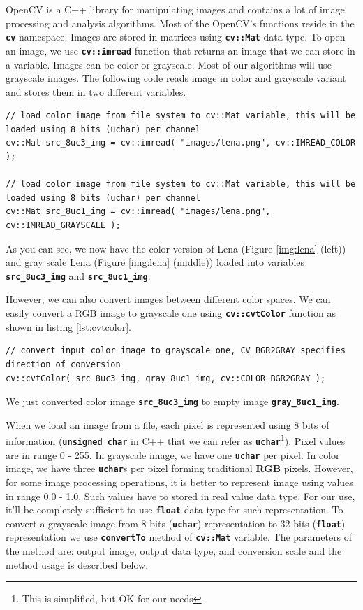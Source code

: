 \documentclass[10pt]{article}
\newcommand{\code}[1]{\textbf{\texttt{#1}}}
\begin{document}
OpenCV is a C++ library for manipulating images and contains a lot of image processing and analysis algorithms.
Most of the OpenCV's functions reside in the \code{cv} namespace.
Images are stored in matrices using \code{cv::Mat} data type.
To open an image, we use \code{cv::imread} function that returns an image that we can store in a variable.
Images can be color or grayscale. Most of our algorithms will use grayscale images.
The following code reads image in color and grayscale variant and stores them in two different variables.

\begin{lstlisting}[style=CStyle,caption={Reading an image.},label={lst:read_image}]
// load color image from file system to cv::Mat variable, this will be loaded using 8 bits (uchar) per channel
cv::Mat src_8uc3_img = cv::imread( "images/lena.png", cv::IMREAD_COLOR );

// load color image from file system to cv::Mat variable, this will be loaded using 8 bits (uchar) per channel
cv::Mat src_8uc1_img = cv::imread( "images/lena.png", cv::IMREAD_GRAYSCALE );
\end{lstlisting}

As you can see, we now have the color version of Lena (Figure \ref{img:lena} (left)) and gray scale Lena (Figure \ref{img:lena} (middle))
loaded into variables \code{src\_8uc3\_img} and \code{src\_8uc1\_img}.

However, we can also convert images between different color spaces.
We can easily convert a RGB image to grayscale one using \code{cv::cvtColor}
function as shown in listing \ref{lst:cvtcolor}.

\begin{lstlisting}[style=CStyle,caption={Converting a color image to a grascale one.},label={lst:cvtcolor}]
// convert input color image to grayscale one, CV_BGR2GRAY specifies direction of conversion
cv::cvtColor( src_8uc3_img, gray_8uc1_img, cv::COLOR_BGR2GRAY );
\end{lstlisting}

We just converted color image \code{src\_8uc3\_img} to empty image \code{gray\_8uc1\_img}.

When we load an image from a file, each pixel is represented using 8 bits of information (\code{unsigned char} in C++ that we can refer as
\code{uchar}\footnote{This is simplified, but OK for our needs}). Pixel values are in range 0 - 255. In grayscale image, we have one \code{uchar} per pixel.
In color image, we have three \code{uchar}s per pixel forming traditional \textbf{RGB} pixels.
However, for some image processing operations, it is better to represent image using values in range 0.0 - 1.0.
Such values have to stored in real value data type. For our use, it'll be completely sufficient to use \code{float} data type for such representation.
To convert a grayscale image from 8 bits (\code{uchar}) representation to 32 bits (\code{float}) representation we use \code{convertTo} method of \code{cv::Mat} variable.
The parameters of the method are: output image, output data type, and conversion scale and the method usage is described below.
\end{document}

